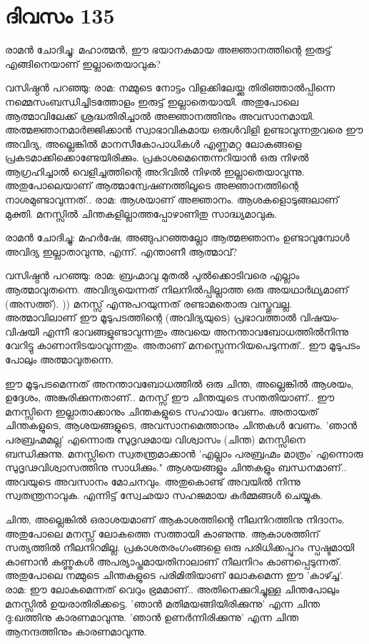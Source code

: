 \newpage
\section{ദിവസം 135}


രാമന്‍ ചോദിച്ചു: മഹാത്മന്‍, ഈ ഭയാനകമായ അജ്ഞാനത്തിന്റെ ഇരുട്ട്‌ എങ്ങിനെയാണ്‌ ഇല്ലാതെയാവുക?

വസിഷ്ഠന്‍ പറഞ്ഞു: രാമ: നമ്മുടെ നോട്ടം വിളക്കിലേയ്ക്കു തിരിഞ്ഞാല്‍പ്പിന്നെ നമ്മെസംബന്ധിച്ചിടത്തോളം ഇരുട്ട്‌ ഇല്ലാതെയായി. അതുപോലെ ആത്മാവിലേക്ക്‌ ശ്രദ്ധതിരിച്ചാല്‍ അജ്ഞാനത്തിനും അവസാനമായി. അത്മജ്ഞാനമാര്‍ജ്ജിക്കാന്‍ സ്വാഭാവികമായ ഒരുള്‍വിളി ഉണ്ടാവുന്നതുവരെ ഈ അവിദ്യ, അല്ലെങ്കില്‍ മാനസീകോപാധികള്‍ എണ്ണമറ്റ ലോകങ്ങളെ പ്രകടമാക്കിക്കൊണ്ടേയിരിക്കും. പ്രകാശമെന്തെന്നറിയാന്‍ ഒരു നിഴല്‍ ആഗ്രഹിച്ചാല്‍ വെളിച്ചത്തിന്റെ അറിവില്‍ നിഴല്‍ ഇല്ലാതെയാവുന്നു. അതുപോലെയാണ്‌ ആത്മാന്വേഷണത്തിലൂടെ അജ്ഞാനത്തിന്റെ നാശമുണ്ടാവുന്നത്‌.. രാമ: ആശയാണ്‌ അജ്ഞാനം. ആശകളൊടുങ്ങലാണ്‌ മുക്തി. മനസ്സില്‍ ചിന്തകളില്ലാത്തപ്പോഴാണിതു സാദ്ധ്യമാവുക.

രാമന്‍ ചോദിച്ചു: മഹര്‍ഷേ, അങ്ങുപറഞ്ഞല്ലോ ആത്മജ്ഞാനം ഉണ്ടാവുമ്പോള്‍ അവിദ്യ ഇല്ലാതാവുന്നു, എന്ന്. എന്താണീ ആത്മാവ്‌?

വസിഷ്ഠന്‍ പറഞ്ഞു: രാമ: ബ്രഹ്മാവു മുതല്‍ പുല്‍ക്കൊടിവരെ എല്ലാം ആത്മാവുതന്നെ. അവിദ്യയെന്നത്‌ നിലനില്‍പ്പില്ലാത്ത ഒരു അയഥാര്‍ഥ്യമാണ്‌ (അസത്ത്‌). ))  മനസ്സ്‌ എന്നുപറയുന്നത്‌ രണ്ടാമതൊരു വസ്തുവല്ല. അത്മാവിലാണ്‌ ഈ മൂടുപടത്തിന്റെ (അവിദ്യയുടെ) പ്രഭാവത്താല്‍ വിഷയം-വിഷയി എന്നീ ഭാവങ്ങളുണ്ടാവുന്നതും അവയെ അനന്താവബോധത്തില്‍നിന്നു വേറിട്ടു കാണാനിടയാവുന്നതും. അതാണ്‌ മനസ്സെന്നറിയപെടുന്നത്‌.. ഈ മൂടുപടം പോലും അത്മാവുതന്നെ.

ഈ മൂടുപടമെന്നത്‌ അനന്താവബോധത്തില്‍ ഒരു ചിന്ത, അല്ലെങ്കില്‍ ആശയം, ഉദ്ദേശം, അങ്കുരിക്കുന്നതാണ്‌.. മനസ്സ്‌ ഈ ചിന്തയുടെ സന്തതിയാണ്‌.. ഈ മനസ്സിനെ ഇല്ലാതാക്കാനും ചിന്തകളുടെ സഹായം വേണം. അതായത്‌ ചിന്തകളുടെ, ആശയങ്ങളുടെ, അവസാനമെത്താനും ചിന്തകള്‍ വേണം.  'ഞാന്‍ പരബ്രഹ്മമല്ല' എന്നൊരു സുദൃഢമായ വിശ്വാസം (ചിന്ത) മനസ്സിനെ ബന്ധിക്കുന്നു. മനസ്സിനെ സ്വതന്ത്രമാക്കാന്‍ 'എല്ലാം പരബ്രഹ്മം മാത്രം' എന്നൊരു സുദൃഢവിശ്വാസത്തിനു സാധിക്കും." ആശയങ്ങളും ചിന്തകളും ബന്ധനമാണ്‌.. അവയുടെ അവസാനം മോചനവും. അതുകൊണ്ട്‌ അവയില്‍ നിന്നു സ്വതന്ത്രനാവുക. എന്നിട്ട്‌ സ്വേഛയാ സഹജമായ കര്‍മ്മങ്ങള്‍ ചെയ്യുക.

ചിന്ത, അല്ലെങ്കില്‍ ഒരാശയമാണ്‌ ആകാശത്തിന്റെ നീലനിറത്തിനു നിദാനം. അതുപോലെ മനസ്സ്‌ ലോകത്തെ സത്തായി കാണുന്നു. ആകാശത്തിന്‌ സത്യത്തില്‍ നീലനിറമില്ല. പ്രകാശതരംഗംങ്ങളെ ഒരു പരിധിക്കപ്പുറം സ്പഷ്ടമായി കാണാന്‍ കണ്ണുകള്‍ അപര്യാപ്തമായതിനാലാണ്‌ നീലനിറം കാണപ്പെടുന്നത്‌. അതുപോലെ നമ്മുടെ ചിന്തകളുടെ പരിമിതിയാണ്‌ ലോകമെന്ന ഈ 'കാഴ്ച്ച'. രാമ: ഈ ലോകമെന്നത്‌ വെറും ഭ്രമമാണ്‌.. അതിനെക്കുറിച്ചുള്ള ചിന്തപോലും മനസ്സില്‍ ഉയരാതിരിക്കട്ടെ. 'ഞാന്‍ മതിമയങ്ങിയിരിക്കുന്നു' എന്ന ചിന്ത ദു:ഖത്തിനു കാരണമാവുന്നു. 'ഞാന്‍ ഉണര്‍ന്നിരിക്കുന്നു' എന്ന ചിന്ത ആനന്ദത്തിനും കാരണമാവുന്നു.

